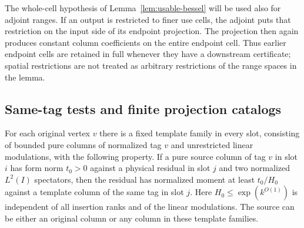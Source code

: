 The whole-cell hypothesis of Lemma~\ref{lem:usable-bessel} will be used
also for adjoint ranges.  If an output is restricted to finer use cells,
the adjoint puts that restriction on the input side of its endpoint
projection.  The projection then again produces constant column
coefficients on the entire endpoint cell.  Thus earlier endpoint cells
are retained in full whenever they have a downstream certificate;
spatial restrictions are not treated as arbitrary restrictions of the
range spaces in the lemma.

\subsection{Same-tag tests and finite projection catalogs}

\begin{lemma}
\label{lem:same-tag}
For each original vertex $v$ there is a fixed template family in every
slot, consisting of bounded pure columns of normalized tag $v$ and
unrestricted linear modulations, with the following property.  If a
pure source column of tag $v$ in slot $i$ has form norm $t_0>0$ against
a physical residual in slot $j$ and two normalized $L^2(I)$ spectators,
then the residual has normalized moment at least $t_0/H_0$ against a
template column of the same tag in slot $j$.  Here
$H_0\le\exp(k^{O(1)})$ is independent of all insertion ranks and of the
linear modulations.  The source can be either an original column or
any column in these template families.
\end{lemma}

